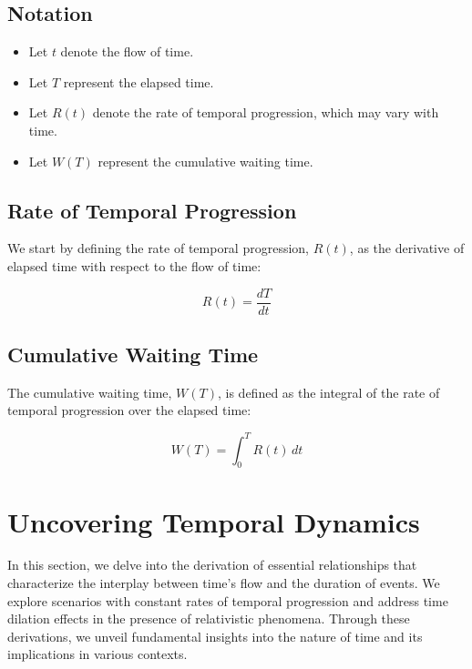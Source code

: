 \documentclass{article}
\begin{document}
\subsection{Notation}

\begin{itemize}
    \item Let $t$ denote the flow of time.
    \item Let $T$ represent the elapsed time.
    \item Let $R(t)$ denote the rate of temporal progression, which may vary with time.
    \item Let $W(T)$ represent the cumulative waiting time.
\end{itemize}

\subsection{Rate of Temporal Progression}

We start by defining the rate of temporal progression, $R(t)$, as the derivative of elapsed time with respect to the flow of time:

\begin{equation}
    R(t) = \frac{dT}{dt}
\end{equation}

\subsection{Cumulative Waiting Time}

The cumulative waiting time, $W(T)$, is defined as the integral of the rate of temporal progression over the elapsed time:

\begin{equation}
    W(T) = \int_0^T R(t) \, dt
\end{equation}

\section{Uncovering Temporal Dynamics}

In this section, we delve into the derivation of essential relationships that characterize the interplay between time's flow and the duration of events. We explore scenarios with constant rates of temporal progression and address time dilation effects in the presence of relativistic phenomena. Through these derivations, we unveil fundamental insights into the nature of time and its implications in various contexts.
\end{document}
